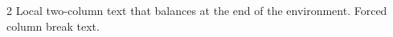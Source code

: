 \documentclass[10pt]{article}
\begin{document}
\begin{multicols}{2}
Local two-column text that balances at the end of the environment.
\columnbreak
Forced column break text.
\end{multicols}
\end{document}
